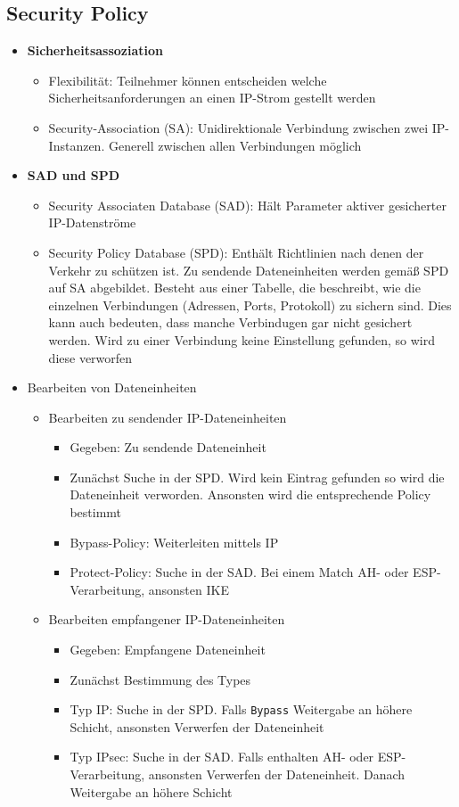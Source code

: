 \subsection{Security Policy}
\begin{itemize}
	\item \textbf{Sicherheitsassoziation}
	\begin{itemize}
		\item Flexibilität: Teilnehmer können entscheiden welche Sicherheitsanforderungen an einen IP-Strom gestellt werden
		\item Security-Association (SA): Unidirektionale Verbindung zwischen zwei IP-Instanzen. Generell zwischen allen Verbindungen möglich
	\end{itemize}
	\item \textbf{SAD und SPD}
	\begin{itemize}
		\item Security Associaten Database (SAD): Hält Parameter aktiver gesicherter IP-Datenströme
		\item Security Policy Database (SPD): Enthält Richtlinien nach denen der Verkehr zu schützen ist. Zu sendende Dateneinheiten werden gemäß SPD auf SA abgebildet. Besteht aus einer Tabelle, die beschreibt, wie die einzelnen Verbindungen (Adressen, Ports, Protokoll) zu sichern sind. Dies kann auch bedeuten, dass manche Verbindugen gar nicht gesichert werden. Wird zu einer Verbindung keine Einstellung gefunden, so wird diese verworfen
	\end{itemize}
	\item Bearbeiten von Dateneinheiten
	\begin{itemize}
		\item Bearbeiten zu sendender IP-Dateneinheiten
		\begin{itemize}
			\item Gegeben: Zu sendende Dateneinheit
			\item Zunächst Suche in der SPD. Wird kein Eintrag gefunden so wird die Dateneinheit verworden. Ansonsten wird die entsprechende Policy bestimmt
			\item Bypass-Policy: Weiterleiten mittels IP
			\item Protect-Policy: Suche in der SAD. Bei einem Match AH- oder ESP-Verarbeitung, ansonsten IKE
		\end{itemize}
		\item Bearbeiten empfangener IP-Dateneinheiten
		\begin{itemize}
			\item Gegeben: Empfangene Dateneinheit
			\item Zunächst Bestimmung des Types
			\item Typ IP: Suche in der SPD. Falls \texttt{Bypass} Weitergabe an höhere Schicht, ansonsten Verwerfen der Dateneinheit
			\item Typ IPsec: Suche in der SAD. Falls enthalten AH- oder ESP-Verarbeitung, ansonsten Verwerfen der Dateneinheit. Danach Weitergabe an höhere Schicht
		\end{itemize}
	\end{itemize}
\end{itemize}


